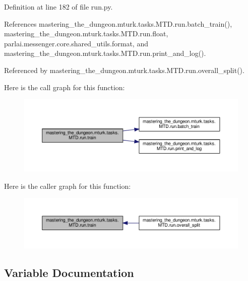 Definition at line 182 of file run.\+py.



References mastering\+\_\+the\+\_\+dungeon.\+mturk.\+tasks.\+M\+T\+D.\+run.\+batch\+\_\+train(), mastering\+\_\+the\+\_\+dungeon.\+mturk.\+tasks.\+M\+T\+D.\+run.\+float, parlai.\+messenger.\+core.\+shared\+\_\+utils.\+format, and mastering\+\_\+the\+\_\+dungeon.\+mturk.\+tasks.\+M\+T\+D.\+run.\+print\+\_\+and\+\_\+log().



Referenced by mastering\+\_\+the\+\_\+dungeon.\+mturk.\+tasks.\+M\+T\+D.\+run.\+overall\+\_\+split().

Here is the call graph for this function\+:
\nopagebreak
\begin{figure}[H]
\begin{center}
\leavevmode
\includegraphics[width=350pt]{namespacemastering__the__dungeon_1_1mturk_1_1tasks_1_1MTD_1_1run_ae3eef3ab364f34b11c71cf1b936afdf1_cgraph}
\end{center}
\end{figure}
Here is the caller graph for this function\+:
\nopagebreak
\begin{figure}[H]
\begin{center}
\leavevmode
\includegraphics[width=350pt]{namespacemastering__the__dungeon_1_1mturk_1_1tasks_1_1MTD_1_1run_ae3eef3ab364f34b11c71cf1b936afdf1_icgraph}
\end{center}
\end{figure}


\subsection{Variable Documentation}
\mbox{\label{namespacemastering__the__dungeon_1_1mturk_1_1tasks_1_1MTD_1_1run_aca0141fea057b26864a487c54763d92c}} 
